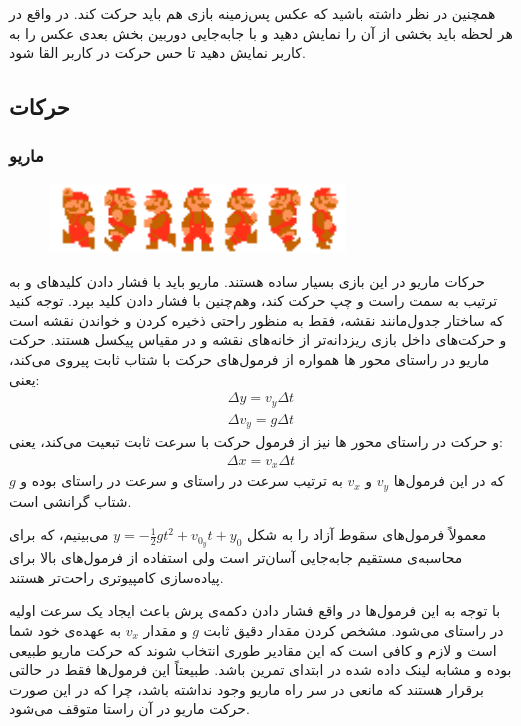 \documentclass{utap}
\begin{document}
همچنین در نظر داشته باشید که عکس پس‌زمینه بازی هم باید حرکت کند. در واقع در هر لحظه باید بخشی از آن را نمایش دهید و با جابه‌جایی دوربین بخش بعدی عکس را به کاربر نمایش دهید تا حس حرکت در کاربر القا شود.
	\subsection{حرکات}
		\subsubsection{ماریو}
			\begin{figure}[H]
			\begin{center}
				\includegraphics[width=0.7\textwidth]{marioWalk}
			\end{center}
		\end{figure}
حرکات ماریو در این بازی بسیار ساده هستند. ماریو باید با فشار دادن کلید‌های  و  به ترتیب به سمت راست و چپ حرکت کند، وهم‌چنین با فشار دادن کلید  بپرد. توجه کنید که ساختار جدول‌مانند نقشه، فقط به منظور راحتی ذخیره کردن و خواندن نقشه است و حرکت‌های داخل بازی ریزدانه‌تر از خانه‌های نقشه و در مقیاس پیکسل هستند. حرکت ماریو در راستای محور ‌ها همواره از فرمول‌های حرکت با شتاب ثابت پیروی می‌کند، یعنی:
	\begin{gather*}
		\Delta y = v_y \Delta t\\
		\Delta v_y = g \Delta t
	\end{gather*}
و حرکت در راستای محور ‌ها نیز از فرمول حرکت با سرعت ثابت تبعیت می‌کند، یعنی:
	\begin{gather*}
		\Delta x = v_x \Delta t
	\end{gather*}
که در این فرمول‌ها $v_y$ و $v_x$ به ترتیب سرعت در راستای  و سرعت در راستای  بوده و $g$ شتاب گرانشی است.

معمولاً فرمول‌های سقوط آزاد را به شکل
$y = -\frac{1}{2}gt^2 + v_{0_y} t + y_0$
می‌بینیم، که برای محاسبه‌ی مستقیم جابه‌جایی آسان‌تر است ولی استفاده از فرمول‌های بالا برای پیاده‌سازی کامپیوتری راحت‌تر هستند.

با توجه به این فرمول‌ها در واقع فشار دادن دکمه‌ی پرش باعث ایجاد یک سرعت اولیه در راستای‌  می‌شود. مشخص کردن مقدار دقیق ثابت $g$ و مقدار $v_x$ به عهده‌ی خود شما است و لازم و کافی است که این مقادیر طوری انتخاب شوند که حرکت ماریو طبیعی بوده و مشابه لینک داده شده در ابتدای تمرین باشد. طبیعتاً این فرمول‌ها فقط در حالتی برقرار هستند که مانعی در سر راه ماریو وجود نداشته باشد، چرا که در این صورت حرکت ماریو در آن راستا متوقف می‌شود.
\end{document}
